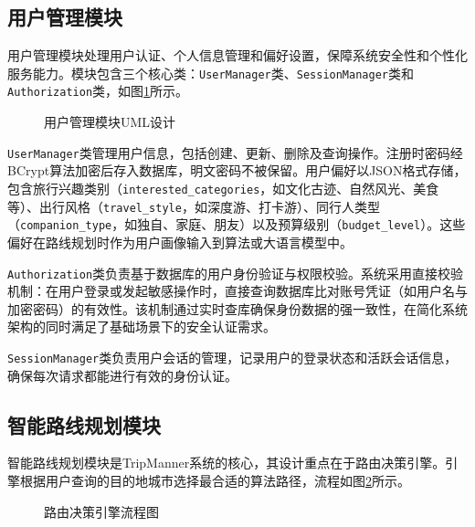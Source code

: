 \subsection{用户管理模块}
\label{sec:ch5_user}

用户管理模块处理用户认证、个人信息管理和偏好设置，保障系统安全性和个性化服务能力。模块包含三个核心类：\texttt{UserManager}类、\texttt{SessionManager}类和\texttt{Authorization}类，如图\ref{fig:ch5_user_uml}所示。

\begin{figure}[hbt]
  \centering
  \caption{用户管理模块UML设计}
  \label{fig:ch5_user_uml}
\end{figure}

\texttt{UserManager}类管理用户信息，包括创建、更新、删除及查询操作。注册时密码经BCrypt算法加密后存入数据库，明文密码不被保留。用户偏好以JSON格式存储，包含旅行兴趣类别（\texttt{interested\_categories}，如文化古迹、自然风光、美食等）、出行风格（\texttt{travel\_style}，如深度游、打卡游）、同行人类型（\texttt{companion\_type}，如独自、家庭、朋友）以及预算级别（\texttt{budget\_level}）。这些偏好在路线规划时作为用户画像输入到算法或大语言模型中。

\texttt{Authorization}类负责基于数据库的用户身份验证与权限校验。系统采用直接校验机制：在用户登录或发起敏感操作时，直接查询数据库比对账号凭证（如用户名与加密密码）的有效性。该机制通过实时查库确保身份数据的强一致性，在简化系统架构的同时满足了基础场景下的安全认证需求。

\texttt{SessionManager}类负责用户会话的管理，记录用户的登录状态和活跃会话信息，确保每次请求都能进行有效的身份认证。

\subsection{智能路线规划模块}
\label{sec:ch5_route}

智能路线规划模块是TripManner系统的核心，其设计重点在于路由决策引擎。引擎根据用户查询的目的地城市选择最合适的算法路径，流程如图\ref{fig:ch5_route_decision}所示。

\begin{figure}[hbt]
  \centering
  \caption{路由决策引擎流程图}
  \label{fig:ch5_route_decision}
\end{figure}

